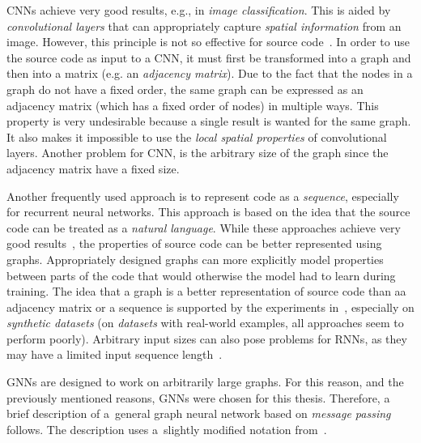 CNNs achieve very good results, e.g., in \textit{image classification}. This is aided by \textit{convolutional layers} that can appropriately capture \textit{spatial information} from an image. However, this principle is not so effective for source code~\cite{gnn-usage}. In order to use the source code as input to a CNN, it must first be transformed into a graph and then into a matrix (e.g. an \textit{adjacency matrix}). Due to the fact that the nodes in a graph do not have a fixed order, the same graph can be expressed as an adjacency matrix (which has a fixed order of nodes) in multiple ways. This property is very undesirable because a single result is wanted for the same graph. It also makes it impossible to use the \textit{local spatial properties} of convolutional layers. Another problem for CNN, is the arbitrary size of the graph since the adjacency matrix have a fixed size.

Another frequently used approach is to represent code as a \textit{sequence}, especially for recurrent neural networks. This approach is based on the idea that the source code can be treated as a \textit{natural language}. While these approaches achieve very good results~\cite{NLP-APPROACH1-buratti2020exploring, NLP-APPROACH2-hanif2022vulberta, pujar2024analyzing}, the properties of source code can be better represented using graphs. Appropriately designed graphs can more explicitly model properties between parts of the code that would otherwise the model had to learn during training. The idea that a graph is a better representation of source code than aa adjacency matrix or a sequence is supported by the experiments in~\cite{GNN4-IBM-suneja2020learning}, especially on \textit{synthetic datasets} (on \textit{datasets} with real-world examples, all approaches seem to perform poorly). Arbitrary input sizes can also pose problems for RNNs, as they may have a limited input sequence length~\cite{pujar2024analyzing}.

GNNs are designed to work on arbitrarily large graphs. For this reason, and the previously mentioned reasons, GNNs were chosen for this thesis. Therefore, a brief description of a~general graph neural network based on \textit{message passing} follows. The description uses a~slightly modified notation from~\cite{GGNN-li2015gated}.

